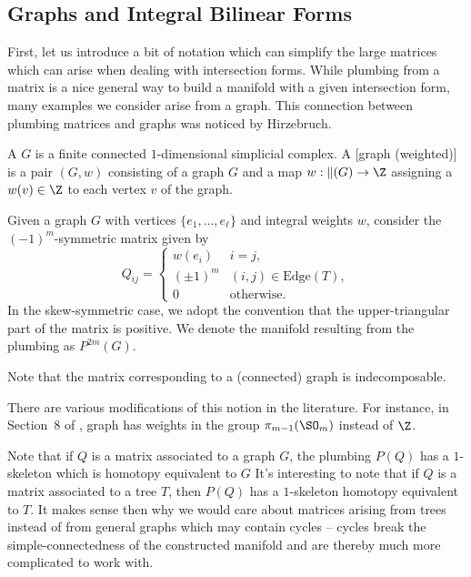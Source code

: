 \subsection{Graphs and Integral Bilinear Forms}
First, let us introduce a bit of notation which can simplify the large matrices which can arise when dealing with intersection forms. While plumbing from a matrix is a nice general way to build a manifold with a given intersection form, many examples we consider arise from a graph. This connection between plumbing matrices and graphs was noticed by Hirzebruch.

\begin{definition}
	A  $G$ is a finite connected $1$-dimensional simplicial complex.
	A [graph (weighted)] is a pair $(G,w)$ consisting of a graph $G$ and a map $w : \Vert(G) \to \Z$ assigning a  $w(v)\in \Z$ to each vertex $v$ of the graph.
\end{definition}

Given a graph $G$ with vertices $\{e_1,\ldots, e_\ell\}$ and integral weights $w$, consider the $(-1)^m$-symmetric matrix given by
\[
	Q_{ij} = \begin{cases}
		w(e_i)    & i=j,                       \\
		(\pm 1)^m & (i,j)\in \textrm{Edge}(T), \\
		0         & \textrm{otherwise}.
	\end{cases}
\]
In the skew-symmetric case, we adopt the convention that the upper-triangular part of the matrix is positive. We denote the manifold resulting from the plumbing as $P^{2m}(G)$.

\begin{remark}
	Note that the matrix corresponding to a (connected) graph is indecomposable.
\end{remark}

\begin{remark}
	There are various modifications of this notion in the literature. For instance, in Section~8 of \cite{hirzebruch1971quadratic}, graph has weights in the group $\pi_{m-1}(\SO_m)$ instead of $\Z$.
\end{remark}

Note that if $Q$ is a matrix associated to a graph $G$, the plumbing $P(Q)$ has a $1$-skeleton which is homotopy equivalent to $G$
It's interesting to note that if $Q$ is a matrix associated to a tree $T$, then $P(Q)$ has a $1$-skeleton homotopy equivalent to $T$. 
It makes sense then why we would care about matrices arising from trees instead of from general graphs which may contain cycles -- cycles break the simple-connectedness of the constructed manifold and are thereby much more complicated to work with.

